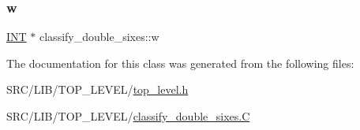 \mbox{\label{classclassify__double__sixes_a0046fc6aa8a23052bb79307421640f99}} 
\subsubsection{\texorpdfstring{w}{w}}
{\footnotesize\ttfamily \mbox{\hyperlink{galois_8h_a09fddde158a3a20bd2dcadb609de11dc}{I\+NT}} $\ast$ classify\+\_\+double\+\_\+sixes\+::w}



The documentation for this class was generated from the following files\+:\begin{DoxyCompactItemize}
\item 
S\+R\+C/\+L\+I\+B/\+T\+O\+P\+\_\+\+L\+E\+V\+E\+L/\mbox{\hyperlink{top__level_8h}{top\+\_\+level.\+h}}\item 
S\+R\+C/\+L\+I\+B/\+T\+O\+P\+\_\+\+L\+E\+V\+E\+L/\mbox{\hyperlink{classify__double__sixes_8_c}{classify\+\_\+double\+\_\+sixes.\+C}}\end{DoxyCompactItemize}
